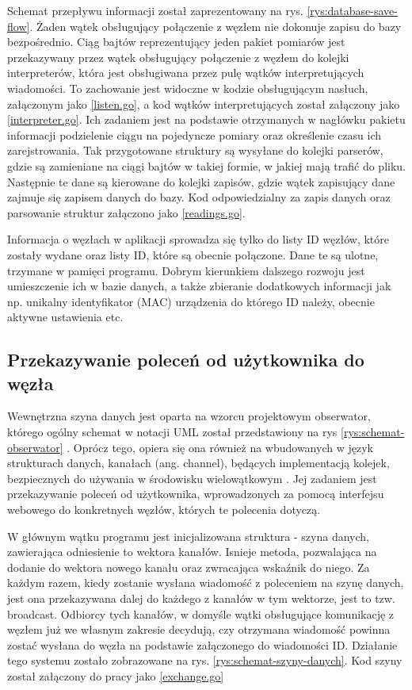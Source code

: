 \documentclass[12pt,oneside,a4paper]{book}
\theoremstyle{break}
\begin{document}
\par Schemat przepływu informacji
został zaprezentowany na rys. \ref{rys:database-save-flow}.
Żaden wątek obsługujący połączenie z węzłem nie dokonuje zapisu
do bazy bezpośrednio. Ciąg bajtów reprezentujący jeden pakiet pomiarów
jest przekazywany przez wątek obsługujący połączenie z węzłem do kolejki
interpreterów, która jest obsługiwana przez pulę wątków 
interpretujących wiadomości. To zachowanie jest widoczne w 
kodzie obsługującym nasłuch, załączonym
jako \ref*{listen.go}, a kod wątków interpretujących
został załączony jako \ref*{interpreter.go}. 
Ich zadaniem jest na podstawie otrzymanych w nagłówku pakietu informacji
podzielenie ciągu na pojedyncze pomiary oraz określenie czasu
ich zarejstrowania. Tak przygotowane struktury są wysyłane do kolejki 
parserów, gdzie są zamieniane na ciągi bajtów w takiej formie, 
w jakiej mają trafić do pliku. Następnie te dane są kierowane do
kolejki zapisów, gdzie wątek zapisujący dane zajmuje się zapisem danych
do bazy.
Kod odpowiedzialny za zapis danych oraz parsowanie struktur załączono
jako \ref*{readings.go}.
\par Informacja o węzłach w aplikacji sprowadza się tylko do 
listy ID węzłów, które zostały wydane oraz listy ID, które są 
obecnie połączone. Dane te są ulotne, trzymane w pamięci programu. 
Dobrym kierunkiem dalszego rozwoju jest umieszczenie ich w bazie 
danych, a także zbieranie dodatkowych informacji jak np. unikalny
identyfikator (MAC) urządzenia do którego ID należy, obecnie
aktywne ustawienia etc.

\subsection{Przekazywanie poleceń od użytkownika do węzła}
Wewnętrzna szyna danych jest oparta na wzorcu projektowym obserwator,
którego ogólny schemat w notacji UML został przedstawiony 
na rys \ref{rys:schemat-obserwator} \cite{gof-patterns}.
Oprócz tego, opiera się ona również na wbudowanych w język
strukturach danych, kanałach (ang. channel), będących implementacją
kolejek, bezpiecznych do używania w środowisku wielowątkowym 
\cite{blue-book}.
Jej zadaniem jest przekazywanie poleceń od użytkownika, wprowadzonych
za pomocą interfejsu webowego do konkretnych węzłów, których 
te polecenia dotyczą.
\par W głównym wątku programu jest inicjalizowana struktura
- szyna danych, 
zawierająca odniesienie to wektora kanałów. Isnieje metoda, 
pozwalająca na dodanie do wektora nowego kanału oraz zwracająca
wskaźnik do niego. Za każdym razem, kiedy zostanie wysłana
wiadomość z poleceniem na szynę danych, jest ona przekazywana
dalej do każdego z kanałów w tym wektorze, jest to 
tzw. broadcast. Odbiorcy tych kanałów, w domyśle wątki 
obsługujące komunikację z węzłem już we własnym  zakresie
decydują, czy otrzymana wiadomość powinna zostać wysłana do
węzła na podstawie załączonego do wiadomości ID. Działanie
tego systemu zostało zobrazowane na rys. \ref{rys:schemat-szyny-danych}.
Kod szyny został załączony do pracy jako \ref*{exchange.go}
\end{document}
